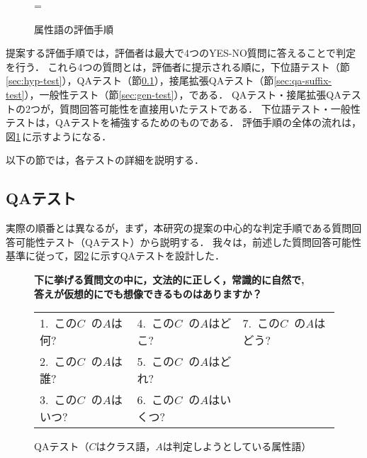 \begin{figure}[t]
\begin{center}
\epsfxsize=\textwidth {}
\end{center}
\caption{属性語の評価手順}
\label{fig:eval-proc}
\end{figure}

提案する評価手順では，評価者は最大で4つのYES-NO質問に答えることで判定を行う．
これら4つの質問とは，評価者に提示される順に，下位語テスト（節\ref{sec:hyp-test}），QAテスト（節\ref{sec:qa-test}），接尾拡張QAテスト（節\ref{sec:qa-suffix-test}），一般性テスト（節\ref{sec:gen-test}），である．
QAテスト・接尾拡張QAテストの2つが，質問回答可能性を直接用いたテストである． 下位語テスト・一般性テストは，QAテストを補強するためのものである．
評価手順の全体の流れは，図\ref{fig:eval-proc}\,に示すようになる．

以下の節では，各テストの詳細を説明する．

\subsection{QAテスト}
\label{sec:qa-test}
実際の順番とは異なるが，まず，本研究の提案の中心的な判定手順である質問回答可能性テスト（QAテスト）から説明する．
我々は，前述した質問回答可能性基準に従って，図\ref{fig:qa-test}\,に示すQAテストを設計した．

\begin{figure}[b]
\begin{boxedminipage}[t]{\textwidth}
\begin{center}
\begin{flushleft}
{\bf 下に挙げる質問文の中に，文法的に正しく，常識的に自然で,\\
\hspace{2cm}答えが仮想的にでも想像できるものはありますか？}
\end{flushleft}
\vspace{2mm}
\begin{tabular}{p{3.5cm}p{4cm}p{3.5cm}}
1.\ この$C\;\;$の$A$は何?     & 4.\ この$C\;\;$の$A$はどこ?  & 7.\ この$C\;\;$の$A$はどう?\\
2.\ この$C\;\;$の$A$は誰?     & 5.\ この$C\;\;$の$A$はどれ?  & \\
3.\ この$C\;\;$の$A$はいつ?   & 6.\ この$C\;\;$の$A$はいくつ? &   \\
\end{tabular}
\end{center}
\end{boxedminipage}
\caption{QAテスト（$C$はクラス語，$A$は判定しようとしている属性語）}
\label{fig:qa-test}
\end{figure}


